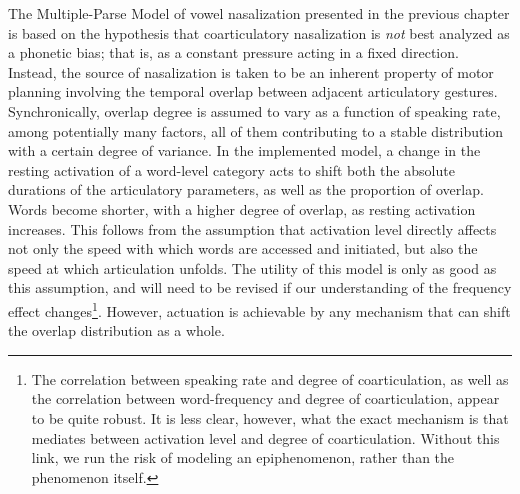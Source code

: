 The Multiple-Parse Model of vowel nasalization presented in the previous
chapter is based on the hypothesis that coarticulatory nasalization
is \emph{not} best analyzed as a phonetic bias; that is, as a constant
pressure acting in a fixed direction. Instead, the source of nasalization
is taken to be an inherent property of motor planning involving the
temporal overlap between adjacent articulatory gestures. Synchronically,
overlap degree is assumed to vary as a function of speaking rate,
among potentially many factors, all of them contributing to a stable
distribution with a certain degree of variance. In the implemented
model, a change in the resting activation of a word-level category
acts to shift both the absolute durations of the articulatory parameters,
as well as the proportion of overlap. Words become shorter, with a
higher degree of overlap, as resting activation increases. This follows
from the assumption that activation level directly affects not only
the speed with which words are accessed and initiated, but also the
speed at which articulation unfolds. The utility of this model is
only as good as this assumption, and will need to be revised if our
understanding of the frequency effect changes\footnote{The correlation between speaking rate and degree of coarticulation,
as well as the correlation between word-frequency and degree of coarticulation,
appear to be quite robust. It is less clear, however, what the exact
mechanism is that mediates between activation level and degree of
coarticulation. Without this link, we run the risk of modeling an
epiphenomenon, rather than the phenomenon itself.}. However, actuation is achievable by any mechanism that can shift
the overlap distribution as a whole.

